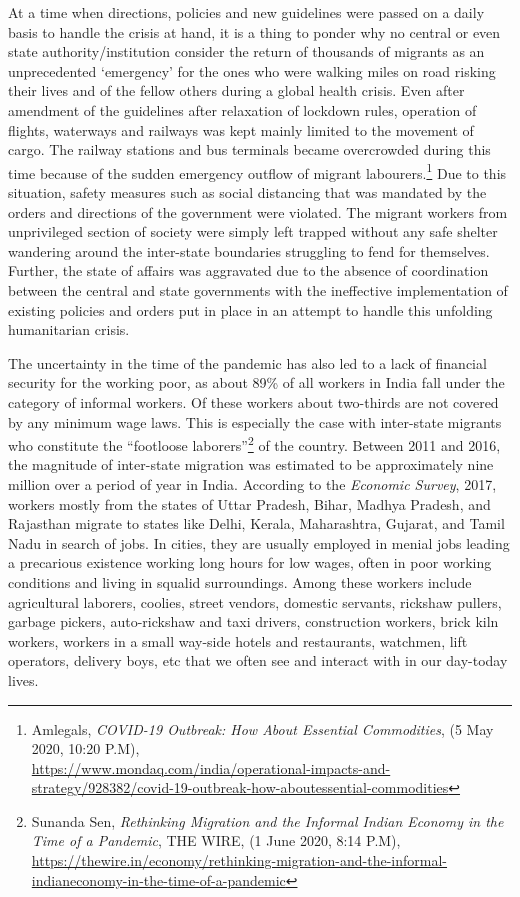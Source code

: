 \begin{multicols}{2}
\noi
At a time when directions, policies and new guidelines were passed on a daily basis to handle
the crisis at hand, it is a thing to ponder why no central or even state authority/institution
consider the return of thousands of migrants as an unprecedented ‘emergency’ for the ones
who were walking miles on road risking their lives and of the fellow others during a global
health crisis. Even after amendment of the guidelines after relaxation of lockdown rules,
operation of flights, waterways and railways was kept mainly limited to the movement of
cargo. The railway stations and bus terminals became overcrowded during this time because
of the sudden emergency outflow of migrant labourers.\footnote{Amlegals, \textit{COVID-19 Outbreak: How About Essential Commodities}, (5 May 2020, 10:20 P.M),\\
\url{https://www.mondaq.com/india/operational-impacts-and-strategy/928382/covid-19-outbreak-how-aboutessential-commodities}} Due to this situation, safety
measures such as social distancing that was mandated by the orders and directions of the
government were violated. The migrant workers from unprivileged section of society were
simply left trapped without any safe shelter wandering around the inter-state boundaries
struggling to fend for themselves. Further, the state of affairs was aggravated due to the
absence of coordination between the central and state governments with the ineffective
implementation of existing policies and orders put in place in an attempt to handle this
unfolding humanitarian crisis. 


\noi
The uncertainty in the time of the pandemic has also led to a lack of financial security for the
working poor, as about 89\% of all workers in India fall under the category of informal
workers. Of these workers about two-thirds are not covered by any minimum wage laws. This
is especially the case with inter-state migrants who constitute the “footloose laborers”\footnote{Sunanda Sen, \textit{Rethinking Migration and the Informal Indian Economy in the Time of a Pandemic}, THE
WIRE, (1 June 2020, 8:14 P.M), \url{https://thewire.in/economy/rethinking-migration-and-the-informal-indianeconomy-in-the-time-of-a-pandemic}} of the
country. Between 2011 and 2016, the magnitude of inter-state migration was estimated to be approximately nine million over a period of year in India. According to the \textit{Economic Survey},
2017, workers mostly from the states of Uttar Pradesh, Bihar, Madhya Pradesh, and
Rajasthan migrate to states like Delhi, Kerala, Maharashtra, Gujarat, and Tamil Nadu in
search of jobs. In cities, they are usually employed in menial jobs leading a precarious
existence working long hours for low wages, often in poor working conditions and living in
squalid surroundings. Among these workers include agricultural laborers, coolies, street
vendors, domestic servants, rickshaw pullers, garbage pickers, auto-rickshaw and taxi drivers,
construction workers, brick kiln workers, workers in a small way-side hotels and restaurants,
watchmen, lift operators, delivery boys, etc that we often see and interact with in our day-today lives.


\end{multicols}

